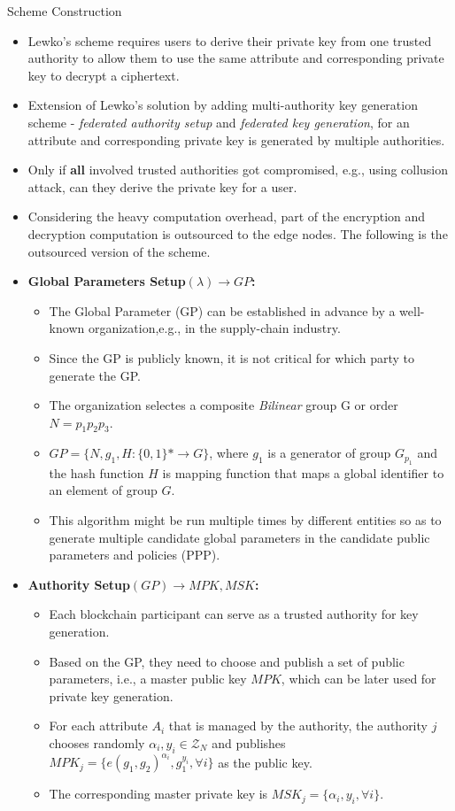 \documentclass[11pt]{beamer}
\begin{document}
\begin{frame}[allowframebreaks]{Scheme Construction}
\begin{itemize}
\item Lewko's scheme requires users to derive their private key from one trusted authority to allow them to use the same attribute and corresponding private key to decrypt a ciphertext.
\item Extension of Lewko's solution by adding multi-authority key generation scheme - \textit{federated authority setup} and \textit{federated key generation}, for an attribute and corresponding private key is generated by multiple authorities.
\item Only if \textbf{all} involved trusted authorities got compromised, e.g., using collusion attack, can they derive the private key for a user.
\item Considering the heavy computation overhead, part of the encryption and decryption computation is outsourced to the edge nodes. The following is the outsourced version of the scheme.
\item \textbf{Global Parameters Setup$(\lambda)\rightarrow GP$:}
	\begin{itemize}
	\item The Global Parameter (GP) can be established in advance by a well-known organization,e.g., in the supply-chain industry.
	\item Since the GP is publicly known, it is not critical for which party to generate the GP.
	\item The organization selectes a composite \textit{Bilinear} group G or order $N=p_1p_2p_3$.
	\item $GP=\{N,g_1,H:\{0,1\}* \rightarrow G\}$, where $g_1$ is a generator of group $G_{p_1}$ and the hash function $H$ is mapping function that maps a global identifier to an element of group $G$.
	\item This algorithm might be run multiple times by different entities so as to generate multiple candidate global parameters in the candidate public parameters and policies (PPP).
	\end{itemize}
\item \textbf{Authority Setup$(GP)\rightarrow MPK,MSK$:}
	\begin{itemize}
	\item Each blockchain participant can serve as a trusted authority for key generation.
	\item Based on the GP, they need to choose and publish a set of public parameters, i.e., a master public key $MPK$, which can be later used for private key generation.
	\item For each attribute $A_i$ that is managed by the authority, the authority $j$ chooses randomly $\alpha_i,y_i \in \mathcal{Z}_N$ and publishes $MPK_j=\{e(g_1,g_2)^{\alpha_i}, g_1^{y_i},\forall i\}$ as the public key.
	\item The corresponding master private key is $MSK_j=\{\alpha_i,y_i,\forall i\}$.
	\end{itemize}
	

\end{itemize}
\end{frame}
\end{document}
